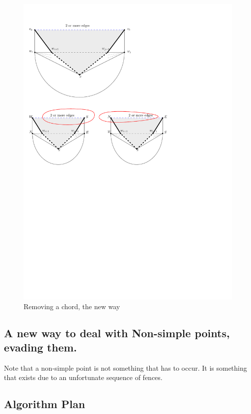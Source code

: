 \begin{figure}[h]
  \centering
  \includegraphics[scale=.6]{img/removeChordNew.pdf}
  \caption{Removing a chord, the new way}
  \label{fig:removeChordNew}
\end{figure}


\subsection{A new way to deal with Non-simple points, evading them.}

Note that a non-simple point is not something that has to occur. It is something that exists due to an unfortunate sequence of fences.


\subsection{Algorithm Plan}

